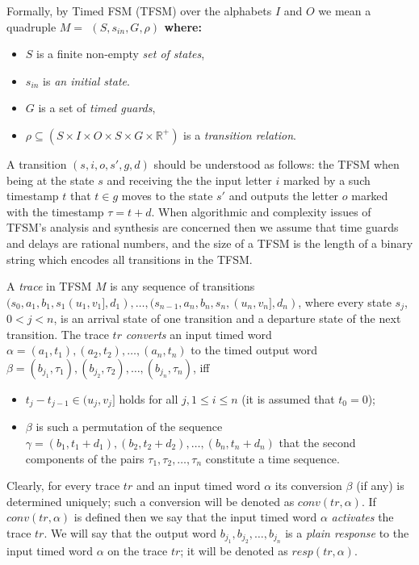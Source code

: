 \documentclass[conference]{IEEEtran}
\begin{document}
Formally, by Timed FSM (TFSM) over the alphabets $I$ and $O$ we mean a quadruple \bf $M = $ \normalfont $( S, s_{in}, G, \rho )$ where:
\begin{itemize}
	\item $S$ is a finite non-empty \emph{set of states},
	\item $s_{in}$ is \emph{an initial state}.
	\item $G$ is a set of \emph{timed guards},
	\item $\rho \subseteq (S \times I \times  O \times S \times G \times \mathbb{R}^+)$ is a \emph{transition relation}.
\end{itemize}
A transition $(s, i, o, s', g, d)$ should be understood as follows: the TFSM when being at the state $s$ and receiving the the input letter $i$ marked by a such timestamp $t$ that $t \in g $ moves to the state $ s' $ and outputs the letter $o$ marked with the timestamp $\tau=t+ d$. When algorithmic and complexity issues of TFSM's analysis and synthesis are concerned then we assume that time guards and delays are rational numbers, and the size of a TFSM is the length of a binary string which encodes all transitions in the TFSM.

A \emph{trace} in TFSM $M$ is any sequence of transitions $ (s_0, a_1, b_1, s_1 (u_1, v_1], d_1), \dots,(s_{n-1}, a_n, b_n, s_n, (u_n, v_n ], d_n) $, where every state $s_j$, $0< j <n$, is an arrival state of one transition and a departure state of the next transition. The trace $tr$ \emph{converts} an input timed word $\alpha = (a_1, t_1), (a_2, t_2), \dots, (a_n, t_n)$ to the timed output word $\beta=(b_{j_1},\tau_1),(b_{j_2},\tau_2),\dots,(b_{j_n},\tau_n)$, iff
\begin{itemize}
	\item $t_j - t_{j-1}\in (u_j,v_j]$ holds for all $j, 1\leq i\leq n$ (it is assumed that $t_0=0$);
	\item $\beta$ is such a permutation of the sequence $ \gamma = (b_1, t_1 + d_1), (b_2, t_2 + d_2), \dots, (b_n, t_n + d_n) $ that the second components of the pairs $\tau_1,\tau_2,\dots,\tau_n$ constitute a time sequence.
\end{itemize}
Clearly, for every trace $tr$ and an input timed word $\alpha$ its conversion $\beta$ (if any) is determined uniquely; such a conversion will be denoted as $conv(tr,\alpha)$. If $conv(tr,\alpha)$ is defined then we say that the input timed word $\alpha$ \emph{activates} the trace $tr$. We will say that the output word $b_{j_1}, b_{j_2}, \dots, b_{j_n}$ is a \emph{plain response} to the input timed word $\alpha$ on the trace $tr$; it will be denoted as $resp(tr,\alpha)$.
\end{document}
